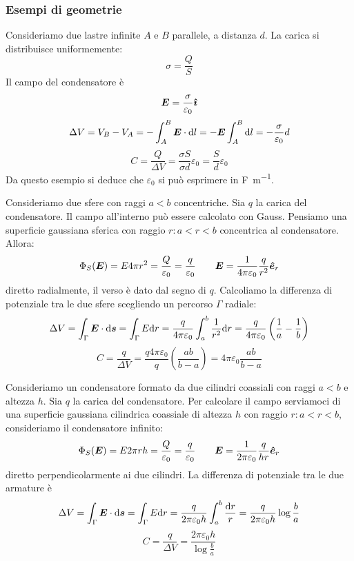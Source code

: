 \subsubsection{Esempi di geometrie}
\begin{Es}[piano]
  Consideriamo due lastre infinite $A$ e $B$ parallele, a distanza $d$. La carica si distribuisce uniformemente:
  \[\sigma=\frac{Q}{S}\]
  Il campo del condensatore è
  \[\boldsymbol{E}=\frac{\sigma}{\varepsilon_0}\boldsymbol{\hat {\imath}}\]
  \[\Delta V=V_B-V_A=-\int_A^B\boldsymbol{E}\cdot\mathrm{d} l=-\boldsymbol{E}\int_A^B\mathrm{d} l=-\frac{\sigma}{\varepsilon_0}d\]
  \[C=\frac{Q}{\Delta V}=\frac{\sigma S}{\sigma d}\varepsilon_0=\frac{S}{d}\varepsilon_0\]
  Da questo esempio si deduce che $\varepsilon_0$ si può esprimere in \si{\farad\per\meter}.
\end{Es}
\begin{Es}[sferico]
  Consideriamo due sfere con raggi $a<b$ concentriche. Sia $q$ la carica del condensatore. Il campo all'interno può essere calcolato con Gauss. Pensiamo una superficie gaussiana sferica con raggio $r:a<r<b$ concentrica al condensatore. Allora:
  \[\Phi_S(\boldsymbol{E})=E 4\pi r^2=\frac{Q}{\varepsilon_0}=\frac{q}{\varepsilon_0}\qquad \boldsymbol{E}=\frac{1}{4\pi\varepsilon_0}\frac{q}{r^2}\boldsymbol{\hat {e}}_r\]
  diretto radialmente, il verso è dato dal segno di $q$. Calcoliamo la differenza di potenziale tra le due sfere scegliendo un percorso $\Gamma$ radiale:
  \[\Delta V=\int_\Gamma\boldsymbol{E}\cdot\mathrm{d}\boldsymbol{s}=\int_\Gamma E\mathrm{d} r=\frac{q}{4\pi\varepsilon_0}\int_a^b\frac{1}{r^2}\mathrm{d} r=\frac{q}{4\pi\varepsilon_0}\left(\frac{1}{a}-\frac{1}{b}\right)\]
  \[C=\frac{q}{\Delta V}=\frac{q4\pi\varepsilon_0}{q}\left(\frac{ab}{b-a}\right)=4\pi\varepsilon_0\frac{ab}{b-a}\]
\end{Es}
\begin{Es}[cilindrico]
  Consideriamo un condensatore formato da due cilindri coassiali con raggi $a<b$ e altezza $h$. Sia $q$ la carica del condensatore. Per calcolare il campo serviamoci di una superficie gaussiana cilindrica coassiale di altezza $h$ con raggio $r:a<r<b$, consideriamo il condensatore infinito:
  \[\Phi_S(\boldsymbol{E})=E2\pi rh=\frac{Q}{\varepsilon_0}=\frac{q}{\varepsilon_0}\qquad \boldsymbol{E}=\frac{1}{2\pi\varepsilon_0}\frac{q}{hr}\boldsymbol{\hat {e}}_r\]
  diretto perpendicolarmente ai due cilindri. La differenza di potenziale tra le due armature è
  \[\Delta V=\int_\Gamma\boldsymbol{E}\cdot\mathrm{d}\boldsymbol{s}=\int_\Gamma E\mathrm{d} r=\frac{q}{2\pi\varepsilon_0h}\int_a^b\frac{\mathrm{d} r}{r}=\frac{q}{2\pi\varepsilon_0h}\log\frac{b}{a}\]
  \[C=\frac{q}{\Delta V}=\frac{2\pi\varepsilon_0h}{\log\frac{b}{a}}\]
\end{Es}
